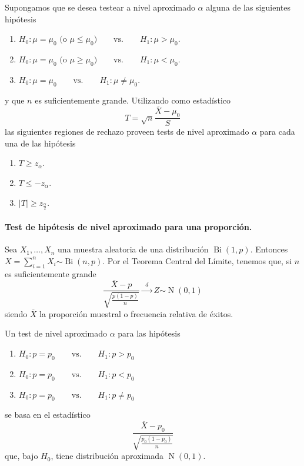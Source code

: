 \documentclass[11pt]{article}
\theoremstyle{plain}
\theoremstyle{definition}
\theoremstyle{remark}
\newcommand{\dists}[1]{\ensuremath{\operatorname{#1}}}  %
\newcommand{\dist}[1]{\ensuremath{\sim \operatorname{#1}}}  %
\newcommand{\tiende}[1]{\ensuremath{\xrightarrow{\;\; #1 \;\;}}}  %
\begin{document}
        Supongamos que se desea testear a nivel aproximado $\alpha$ alguna de las siguientes hipótesis
        \begin{enumerate}
          \item $ H_0 : \mu = \mu_0 \text{ (o $\mu \leq \mu_0$)} \qquad \text{vs.} \qquad H_1 : \mu > \mu_0 $.
          \item $ H_0 : \mu = \mu_0 \text{ (o $\mu \geq \mu_0$)} \qquad \text{vs.} \qquad H_1 : \mu < \mu_0 $.
          \item $ H_0 : \mu = \mu_0 \qquad \text{vs.} \qquad H_1 : \mu \neq \mu_0 $.
        \end{enumerate}
        y que $n$ es suficientemente grande. Utilizando como estadístico 
        \[ T = \sqrt{n} \frac{\overline{X} - \mu_0}{S} \]
        las siguientes regiones de rechazo proveen tests de nivel aproximado $\alpha$ para cada una de las hipótesis
        \begin{enumerate}
          \item $T \geq z_\alpha$.
          \item $T \leq - z_\alpha$.
          \item $\vert T \vert \geq z_\frac{\alpha}{2}$.
        \end{enumerate}

        \paragraph{Test de hipótesis de nivel aproximado para una proporción.}

        Sea $X_1, \dots, X_n$ una muestra aleatoria de una distribución $\dists{Bi}(1,p)$. Entonces $X = \sum_{i=1}^n X_i \dist{Bi}(n,p)$.  Por el Teorema Central del Límite, tenemos que, si $n$ es suficientemente grande
        \[ \frac{\overline{X} - p}{\sqrt{\frac{p (1 - p)}{n}}} \tiende{d} Z \dist{N}(0,1) \]
        siendo $\overline{X}$ la proporción muestral o frecuencia relativa de éxitos.

        Un test de nivel aproximado $\alpha$ para las hipótesis
        \begin{enumerate}
          \item $ H_0 : p = p_0 \qquad \text{vs.} \qquad H_1 : p > p_0 $
          \item $ H_0 : p = p_0 \qquad \text{vs.} \qquad H_1 : p < p_0 $
          \item $ H_0 : p = p_0 \qquad \text{vs.} \qquad H_1 : p \neq p_0 $
        \end{enumerate}
        se basa en el estadístico
        \[ \frac{\overline{X} - p_0}{\sqrt{\frac{p_0 (1 - p_0)}{n}}} \]
        que, bajo $H_0$, tiene distribución aproximada $\dists{N}(0,1)$.
\end{document}
